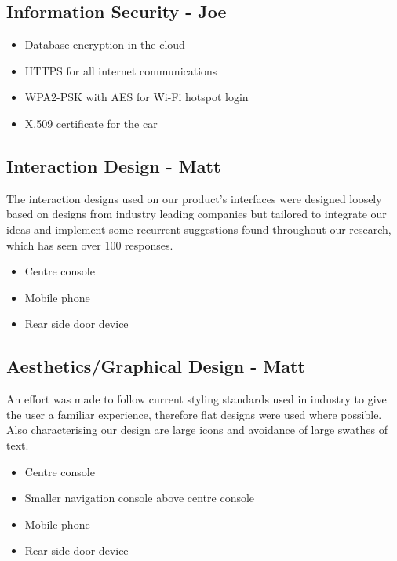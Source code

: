 \documentclass{article}
\begin{document}
\subsection{Information Security - Joe}\label{ssec:information-security}
	\begin{itemize}
		\item Database encryption in the cloud
        \item HTTPS for all internet communications
        \item WPA2-PSK with AES for Wi-Fi hotspot login
        \item X.509 certificate for the car
	\end{itemize}

\subsection{Interaction Design - Matt}\label{sssec:interaction-design}
The interaction designs used on our product's interfaces were designed loosely based on designs from industry leading companies but tailored to integrate our ideas and implement some recurrent suggestions found throughout our research, which has seen over 100 responses.

    \begin{itemize}
      \item Centre console
      \item Mobile phone
      \item Rear side door device
    \end{itemize}
\subsection{Aesthetics/Graphical Design - Matt}\label{ssec:aesthetics}
An effort was made to follow current styling standards used in industry to give the user a familiar experience, therefore flat designs were used where possible. Also characterising our design are large icons and avoidance of large swathes of text.

    \begin{itemize}
		\item Centre console
        \item Smaller navigation console above centre console
        \item Mobile phone
        \item Rear side door device
	\end{itemize}
\end{document}

